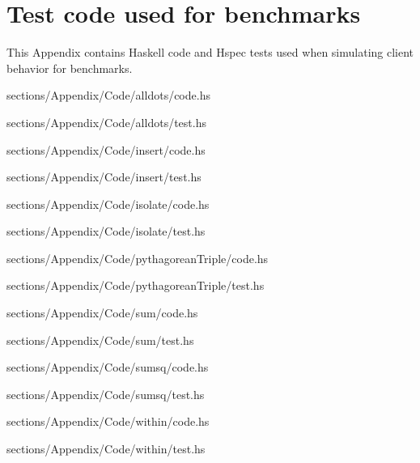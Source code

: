 \chapter{Test code used for benchmarks} \label{chap:TestCode}
This Appendix contains Haskell code and Hspec tests used when simulating client behavior for benchmarks. 



{sections/Appendix/Code/alldots/code.hs}

{sections/Appendix/Code/alldots/test.hs}


{sections/Appendix/Code/insert/code.hs}

{sections/Appendix/Code/insert/test.hs}


{sections/Appendix/Code/isolate/code.hs}

{sections/Appendix/Code/isolate/test.hs}


{sections/Appendix/Code/pythagoreanTriple/code.hs}

{sections/Appendix/Code/pythagoreanTriple/test.hs}


{sections/Appendix/Code/sum/code.hs}

{sections/Appendix/Code/sum/test.hs}


{sections/Appendix/Code/sumsq/code.hs}

{sections/Appendix/Code/sumsq/test.hs}


{sections/Appendix/Code/within/code.hs}

{sections/Appendix/Code/within/test.hs}



